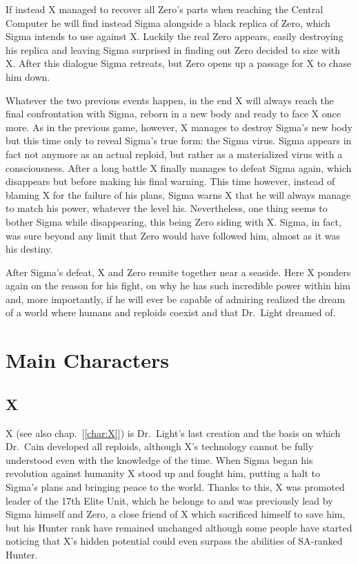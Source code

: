If instead X managed to recover all Zero's parts when reaching the Central Computer he will find instead Sigma alongside a black replica of Zero, which Sigma intends to use against X. Luckily the real Zero appears, easily destroying his replica and leaving Sigma surprised in finding out Zero decided to size with X. After this dialogue Sigma retreats, but Zero opens up a passage for X to chase him down.

Whatever the two previous events happen, in the end X will always reach the final confrontation with Sigma, reborn in a new body and ready to face X once more. As in the previous game, however, X manages to destroy Sigma's new body but this time only to reveal Sigma's true form: the Sigma virus. Sigma appears in fact not anymore as an actual reploid, but rather as a materialized virus with a consciousness. After a long battle X finally manages to defeat Sigma again, which disappears but before making his final warning. This time however, instead of blaming X for the failure of his plans, Sigma warns X that he will always manage to match his power, whatever the level his. Nevertheless, one thing seems to bother Sigma while disappearing, this being Zero siding with X. Sigma, in fact, was sure beyond any limit that Zero would have followed him, almost as it was his destiny.

After Sigma's defeat, X and Zero reunite together near a seaside. Here X ponders again on the reason for his fight, on why he has such incredible power within him and, more importantly, if he will ever be capable of admiring realized the dream of a world where humans and reploids coexist and that Dr.~Light dreamed of.

\section{Main Characters}

\subsection{X}
X (see also chap.~[\ref{char:X}])  is Dr.~Light's last creation and the basis on which Dr.~Cain developed all reploids, although X's technology cannot be fully understood even with the knowledge of the time. When Sigma began his revolution against humanity X stood up and fought him, putting a halt to Sigma's plans and bringing peace to the world. Thanks to this, X was promoted leader of the 17th Elite Unit, which he belongs to and was previously lead by Sigma himself and Zero, a close friend of X which sacrificed himself to save him, but his Hunter rank have remained unchanged although some people have started noticing that X's hidden potential could even surpass the abilities of SA-ranked Hunter.

